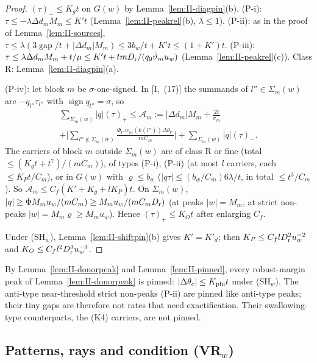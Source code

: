 \documentclass[10pt]{amsart}
\theoremstyle{definition}
\theoremstyle{remark}
\newcommand{\sgn}{\operatorname{sign}}
\newcommand{\gap}{\operatorname{gap}}
\begin{document}
\begin{proof}
$(\tau)_-\le K_gt$ on $G(w)$ by Lemma~\ref{lem:II-diagpin}(b).  (P-i):
$\tau\le-\lambda\Delta d_mM_m\le K't$ (Lemma~\ref{lem:II-peakrel}(b),
$\lambda\le1$).  (P-ii): as in the proof of Lemma~\ref{lem:II-sources},
$\tau\le\lambda(3\gap/t+|\Delta d_m|M_m)\le3b_w/t+K't\le(1+K')t$.  (P-iii):
$\tau\le\lambda\Delta d_mM_m+t/\mu\le K't+tmD_{\rm r}/(q_0\bar\vartheta_mu_w)$
(Lemma~\ref{lem:II-peakrel}(c)).  Class R: Lemma~\ref{lem:II-diagpin}(a).

(P-iv): let block $m$ be $\sigma$-one-signed.  In [I,~(17)] the summands
of $l''\in\Sigma_m(w)$ are $-q_{l''}\tau_{l''}$ with $\sgn q_{l''}=\sigma$,
so
\begin{multline*}
 \sum_{\Sigma_m(w)}|q|(\tau)_+\le\mathcal A_m:=|\Delta d_m|M_m+\frac{2t}
 {\sigma_m}\\+\Big|\sum_{l''\notin\Sigma_m(w)}\frac{\Phi_{l''}w_m(k(l''))
 \Delta\theta_{l''}}{mC_m}\Big|+\sum_{\Sigma_m(w)}|q|(\tau)_- .
\end{multline*}
The carriers of block $m$ outside $\Sigma_m(w)$ are of class R or fine
(total $\le(K_gt+t^7)/(mC_m)$), of types (P-i), (P-ii) (at most $l$
carriers, each $\le K_Pt/C_m$), or in $G(w)$ with $\varrho\le b_w$
($|q\tau|\le(b_w/C_m)6\lambda/t$, in total $\le t^3/C_m$).  So $\mathcal
A_m\le C_f(K'+K_g+lK_P)t$.  On $\Sigma_m(w)$, $|q|\ge\Phi M_mu_w/(mC_m)\ge
M_mu_w/(mC_mD_{\rm r})$ (at peaks $|w|=M_m$, at strict non-peaks
$|w|=M_m\varrho\ge M_mu_w$).  Hence $(\tau)_+\le K_Ot$ after enlarging $C_f$.

Under (SH$_w$), Lemma~\ref{lem:II-shiftpin}(b) gives $K'=K'_d$; then
$K_P\le C_flD_{\rm r}^2u_w^{-2}$ and $K_O\le C_fl^2D_{\rm r}^3u_w^{-3}$.
\end{proof}

By Lemma~\ref{lem:II-donorpeak} and Lemma~\ref{lem:II-pinned}, every
robust-margin peak of Lemma~\ref{lem:II-donorpeak} is pinned:
$|\Delta\theta_c|\le K_{\rm pin}t$ under (SH$_w$).  The anti-type
near-threshold strict non-peaks (P-ii) are pinned like anti-type peaks;
their tiny gaps are therefore not rates that need exactification.  Their
swallowing-type counterparts, the (K4) carriers, are not pinned.

\subsection*{Patterns, rays and condition (VR$_w$)}
\end{document}

